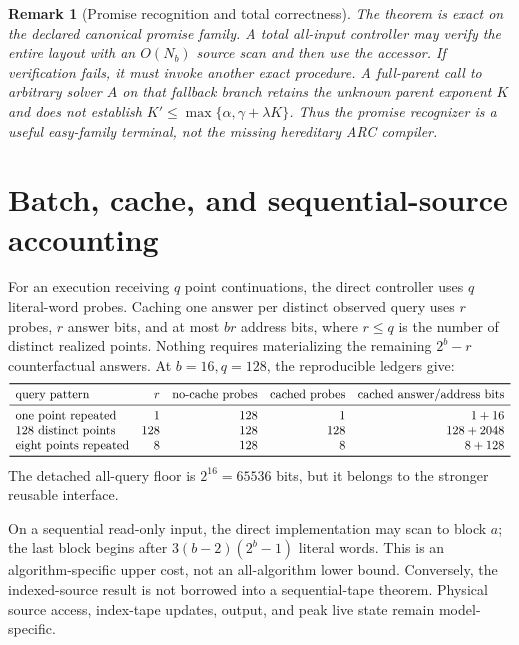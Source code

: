 \documentclass[11pt]{article}
\newtheorem{remark}{Remark}
\begin{document}
\begin{remark}[Promise recognition and total correctness]
The theorem is exact on the declared canonical promise family.  A total
all-input controller may verify the entire layout with an $O(N_b)$ source scan
and then use the accessor.  If verification fails, it must invoke another exact
procedure.  A full-parent call to arbitrary solver $A$ on that fallback branch
retains the unknown parent exponent $K$ and does not establish
$K'\le\max\{\alpha,\gamma+\lambda K\}$.  Thus the promise recognizer is a
useful easy-family terminal, not the missing hereditary ARC compiler.
\end{remark}

\section{Batch, cache, and sequential-source accounting}
For an execution receiving $q$ point continuations, the direct controller uses
$q$ literal-word probes.  Caching one answer per distinct observed query uses
$r$ probes, $r$ answer bits, and at most $br$ address bits, where $r\le q$ is
the number of distinct realized points.  Nothing requires materializing the
remaining $2^b-r$ counterfactual answers.  At $b=16,q=128$, the reproducible
ledgers give:
\[
\begin{array}{lrrrr}
\toprule
\text{query pattern}&r&\text{no-cache probes}&\text{cached probes}&
\text{cached answer/address bits}\\
\midrule
\text{one point repeated}&1&128&1&1+16\\
\text{128 distinct points}&128&128&128&128+2048\\
\text{eight points repeated}&8&128&8&8+128\\
\bottomrule
\end{array}
\]
The detached all-query floor is $2^{16}=65536$ bits, but it belongs to the
stronger reusable interface.

On a sequential read-only input, the direct implementation may scan to block
$a$; the last block begins after
$3(b-2)(2^b-1)$ literal words.  This is an algorithm-specific upper cost, not
an all-algorithm lower bound.  Conversely, the indexed-source result is not
borrowed into a sequential-tape theorem.  Physical source access, index-tape
updates, output, and peak live state remain model-specific.
\end{document}

